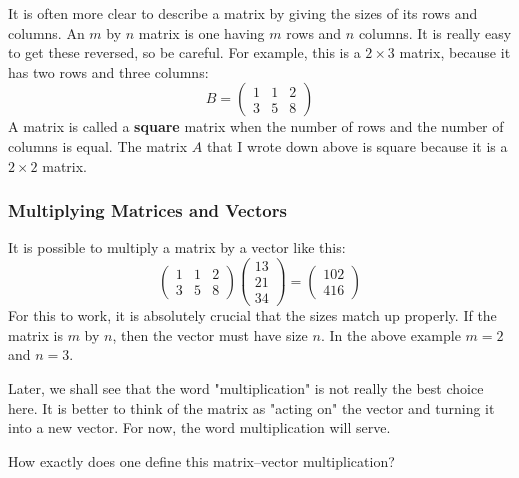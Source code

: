 \documentclass[10pt,]{book}
\newcommand{\terminology}[1]{\textbf{#1}}
\theoremstyle{plain}
\numberwithin{equation}{section}
\begin{document}
      It is often more clear to describe a matrix by giving the sizes of its
      rows and columns. An \(m\) by \(n\) matrix is one having \(m\)
      rows and \(n\) columns. It is really easy to get these reversed, so be
      careful. For example, this is a \(2\times 3\) matrix, because it has
      two rows and three columns:\[
        B = \begin{pmatrix} 1 & 1 & 2 \\ 3 & 5 & 8 \end{pmatrix}
      \]
      A matrix is called a \terminology{square} matrix when the number of rows and
      the number of columns is equal. The matrix \(A\) that I wrote down
      above is square because it is a \(2\times 2\) matrix.
\typeout{************************************************}
\typeout{************************************************}
\subsubsection[Multiplying Matrices and Vectors]{Multiplying Matrices and Vectors}\label{subsubsection-4}

        It is possible to multiply a matrix by a vector like this:\[
          \begin{pmatrix} 1 & 1 & 2 \\ 3 & 5 & 8 \end{pmatrix}
          \begin{pmatrix} 13 \\ 21 \\ 34 \end{pmatrix} =
          \begin{pmatrix} 102 \\ 416 \end{pmatrix}
        \]
        For this to work, it is absolutely crucial that the sizes match up
        properly. If the matrix is \(m\) by \(n\), then the vector must have
        size \(n\). In the above example \(m = 2\) and \(n=3\).
\par

        Later, we shall see that the word "multiplication" is not really the
        best choice here. It is better to think of the matrix as "acting on"
        the vector and turning it into a new vector. For now, the word
        multiplication will serve.
\par

        How exactly does one define this matrix--vector multiplication?
\typeout{************************************************}
\typeout{************************************************}
\end{document}
